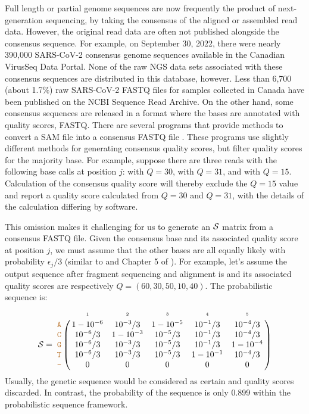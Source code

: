 \documentclass[12pt]{article}
\begin{document}
Full length or partial genome sequences are now frequently the product of next-generation sequencing, by taking the consensus of the aligned or assembled read data.
However, the original read data are often not published alongside the consensus sequence.
For example, on September 30, 2022, there were nearly 390,000 SARS-CoV-2 consensus genome sequences available in the Canadian VirusSeq Data Portal.
None of the raw NGS data sets associated with these consensus sequences are distributed in this database, however.
Less than 6,700 (about 1.7\%) raw SARS-CoV-2 FASTQ files for samples collected in Canada have been published on the NCBI Sequence Read Archive.
On the other hand, some consensus sequences are released in a format where the bases are annotated with quality scores, \eg FASTQ.
There are several programs that provide methods to convert a SAM file into a consensus FASTQ file \cite{liAdjustQualityScores2004, keithSimulatedAnnealingAlgorithm2002, liMappingShortDNA2008a}.
These programs use slightly different methods for generating consensus quality scores, but filter quality scores for the majority base.
For example, suppose there are three reads with the following base calls at position $j$:  with $Q=30$,  with $Q=31$, and  with $Q=15$.
Calculation of the consensus quality score will thereby exclude the $Q=15$ value and report a quality score calculated from $Q=30$ and $Q=31$, with the details of the calculation differing by software.


This omission makes it challenging for us to generate an $\mathcal{S}$ matrix from a consensus FASTQ file.
Given the consensus base and its associated quality score at position $j$, we must assume that the other bases are all equally likely with probability $\epsilon_j/3$ (similar to \cite{kuoEAGLEExplicitAlternative2018} and Chapter 5 of \cite{kozlov}).
For example, let's assume the output sequence after fragment sequencing and alignment is  and its associated quality scores are respectively $Q=(60,30,50,10,40)$.
The probabilistic sequence is:
\begin{equation}
\nps = 
\bordermatrix{
&\scriptscriptstyle{1} & \scriptscriptstyle{2}& \scriptscriptstyle{3}& \scriptscriptstyle{4} & \scriptscriptstyle{5} \cr
\sq{A} & 1-10^{-6} & 10^{-3}/3  & 1-10^{-5} & 10^{-1}/3 & 10^{-4}/3  \cr
\sq{C} & 10^{-6}/3 & 1-10^{-3}  & 10^{-5}/3 & 10^{-1}/3 & 10^{-4}/3  \cr
\sq{G} & 10^{-6}/3 & 10^{-3}/3  & 10^{-5}/3 & 10^{-1}/3 & 1-10^{-4} \cr
\sq{T} & 10^{-6}/3 & 10^{-3}/3  & 10^{-5}/3 & 1-10^{-1} & 10^{-4}/3 \cr
\sq{-} & 0 & 0 & 0 & 0 & 0 \cr
}
\end{equation}
Usually, the genetic sequence  would be considered as certain and quality scores discarded.
In contrast, the probability of the sequence  is only 0.899 within the probabilistic sequence framework.
\end{document}
